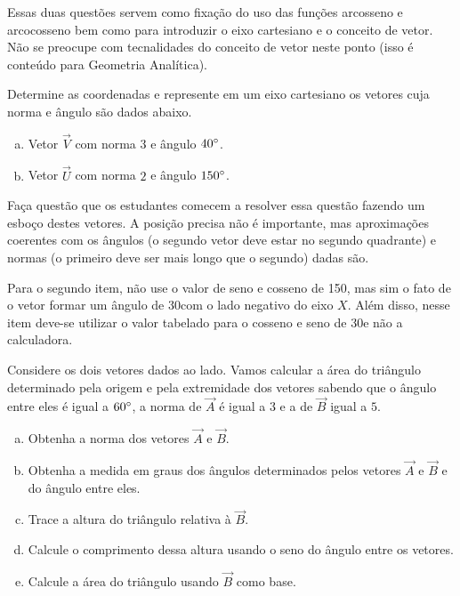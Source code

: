 \documentclass[main_estudante.tex]{subfiles}
\begin{document}
Essas duas questões servem como fixação do uso das funções arcosseno e arcocosseno bem como para introduzir o eixo cartesiano e o conceito de vetor. Não se preocupe com tecnalidades do conceito de vetor neste ponto (isso é conteúdo para Geometria Analítica).

\begin{questao}
Determine as coordenadas e represente em um eixo cartesiano os vetores cuja norma e ângulo são dados abaixo.
\begin{enumerate}[a)]
\item Vetor $\overrightarrow{V}$ com norma $3$ e ângulo $40\degree$.
\item Vetor $\overrightarrow{U}$ com norma $2$ e ângulo $150\degree$.
\end{enumerate}
\end{questao}

Faça questão que os estudantes comecem a resolver essa questão fazendo um esboço destes vetores. A posição precisa não é importante, mas aproximações coerentes com os ângulos (o segundo vetor deve estar no segundo quadrante) e normas (o primeiro deve ser mais longo que o segundo) dadas são.

Para o segundo item, não use o valor de seno e cosseno de 150\degree, mas sim o fato de o vetor formar um ângulo de 30\degree com o lado negativo do eixo $X$. Além disso, nesse item deve-se utilizar o valor tabelado para o cosseno e seno de 30\degree e não a calculadora.

\begin{questao}
Considere os dois vetores dados ao lado. Vamos calcular a área do triângulo determinado pela origem e pela extremidade dos vetores sabendo que o ângulo entre eles é igual a $60\degree$, a norma de $\overrightarrow{A}$ é igual a $3$ e a de $\overrightarrow{B}$ igual a $5$.
\begin{enumerate}[a)]
\item Obtenha a norma dos vetores $\overrightarrow{A}$ e $\overrightarrow{B}$.
\item Obtenha a medida em graus dos ângulos determinados pelos vetores $\overrightarrow{A}$ e $\overrightarrow{B}$ e do ângulo entre eles.
\item Trace a altura do triângulo relativa à $\overrightarrow{B}$.
\item Calcule o comprimento dessa altura usando o seno do ângulo entre os vetores.
\item Calcule a área do triângulo usando $\overrightarrow{B}$ como base.
\end{enumerate}
\end{questao}
\end{document}
